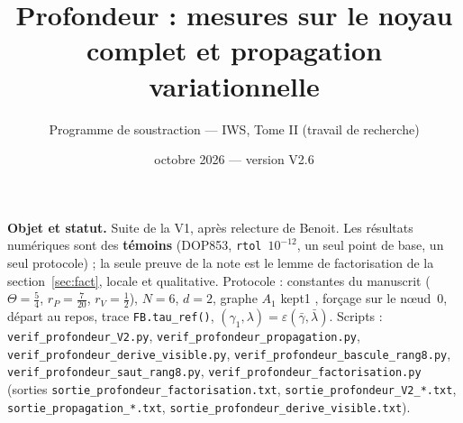 \documentclass[11pt,a4paper]{article}
\title{Profondeur : mesures sur le noyau complet et propagation variationnelle}
\author{Programme de soustraction --- IWS, Tome II (travail de recherche)}
\date{octobre 2026 --- version V2.6}
\theoremstyle{remark}
\begin{document}
\maketitle

\noindent\textbf{Objet et statut.} Suite de la V1, apr\`es relecture de Benoit. Les r\'esultats num\'eriques sont des \textbf{t\'emoins} (DOP853, \texttt{rtol}~$10^{-12}$, un seul point de base, un seul protocole) ; la seule preuve de la note est le lemme de factorisation de la section~\ref{sec:fact}, locale et qualitative. Protocole : constantes du manuscrit ($\Theta=\frac54$, $r_P=\frac7{20}$, $r_V=\frac12$), $N=6$, $d=2$, graphe $A_1$ \og kept1 \fg, for\c{c}age sur le n\oe ud~0, d\'epart au repos, trace \texttt{FB.tau\_ref()}, $(\gamma_1,\lambda)=\varepsilon(\bar\gamma,\bar\lambda)$. Scripts : \texttt{verif\_profondeur\_V2.py}, \texttt{verif\_profondeur\_propagation.py}, \texttt{verif\_profondeur\_derive\_visible.py}, \texttt{verif\_profondeur\_bascule\_rang8.py}, \texttt{verif\_profondeur\_saut\_rang8.py}, \texttt{verif\_profondeur\_factorisation.py} (sorties \texttt{sortie\_profondeur\_factorisation.txt},  \texttt{sortie\_profondeur\_V2\_*.txt}, \texttt{sortie\_propagation\_*.txt}, \texttt{sortie\_profondeur\_derive\_visible.txt}).
\end{document}
